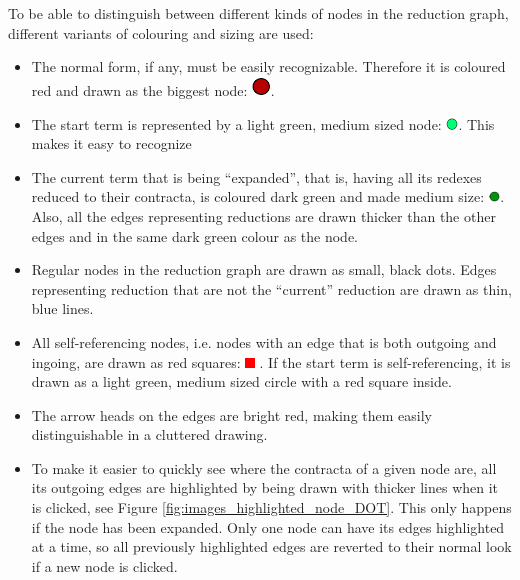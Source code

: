 To be able to distinguish between different kinds of nodes in the reduction graph,
different variants of colouring and sizing are used:
\begin{itemize}
	\item The normal form, if any, must be easily recognizable. Therefore it is
	coloured red and drawn as the biggest node: \includegraphics[height=0.2in]{../images/NF_example.png}.
	
	\item The start term is represented by a light green, medium sized node: 
	\includegraphics[height=0.12in]{../images/STARTNODE_example.png}.
	This makes it easy to recognize
	
	\item The current term that is being ``expanded'', that is, having all its
	redexes reduced to their contracta, is coloured dark green and made medium size:
	\includegraphics[height=0.12in]{../images/CURRENTNODE_example.png}.
	Also, all the edges representing reductions are drawn thicker than the other edges
	and in the same dark green colour as the node.
	
	\item Regular nodes in the reduction graph are drawn as small, black dots.
	Edges representing reduction that are not the ``current'' reduction are
	drawn as thin, blue lines.
	
	\item All self-referencing nodes, i.e. nodes with an edge that is both outgoing 
	and ingoing, are drawn as red squares: \includegraphics[height=0.1in]{../images/redsquare_example.png} . 
	If the start term is self-referencing,
	it is drawn as a light green, medium sized circle with a red square inside.
	
	\item The arrow heads on the edges are bright red, making them easily 
	distinguishable in a cluttered drawing.
	
	\item To make it easier to quickly see where the contracta of a given node are,
	all its outgoing edges are highlighted by being drawn with thicker lines
	when it is clicked, see Figure \ref{fig:images_highlighted_node_DOT}. 
	This only happens if the node has been expanded. Only one node can have 
	its edges highlighted at a time, so all previously highlighted edges are 
	reverted to their normal look if a new node is clicked. 
\end{itemize}
